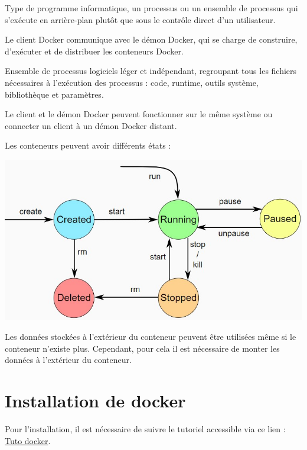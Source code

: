 \documentclass[french, 12pt]{article}%
\newcommand{\titreencadre}{Titre}
\newenvironment{encadre}[1]{\renewcommand{\titreencadre}{#1}
	\begin{mdframed}[style=encadrestyle]
	\vspace{0.5\baselineskip}
	}{%
	\end{mdframed}}
\begin{document}
\begin{encadre}{Daemon}
Type de programme informatique, un processus ou un ensemble de processus qui s'exécute en arrière-plan plutôt que sous le contrôle direct d'un utilisateur.
\end{encadre}  
  
Le client Docker communique avec le démon Docker, qui se charge de construire, d'exécuter et de distribuer les conteneurs Docker. 


\begin{encadre}{Container}
Ensemble de processus logiciels léger et indépendant, regroupant tous les fichiers nécessaires à l’exécution des processus : code, runtime, outils système, bibliothèque et paramètres.
\end{encadre}

Le client et le démon Docker peuvent fonctionner sur le même système ou connecter un client à un démon Docker distant. 

 Les conteneurs peuvent avoir différents états : 
 
 \begin{center}
 \includegraphics[scale=0.7]{./ressource/docker_etat}
 \end{center}

Les données stockées à l'extérieur du conteneur peuvent être utilisées même si le conteneur n'existe plus. Cependant, pour cela il est nécessaire de monter les données à l'extérieur du conteneur.


\section{Installation de docker }

Pour l'installation, il est nécessaire de suivre le tutoriel accessible via ce lien : \href{https://practicalprogramming.fr/install-docker-windows/}{Tuto docker}.
\end{document}

